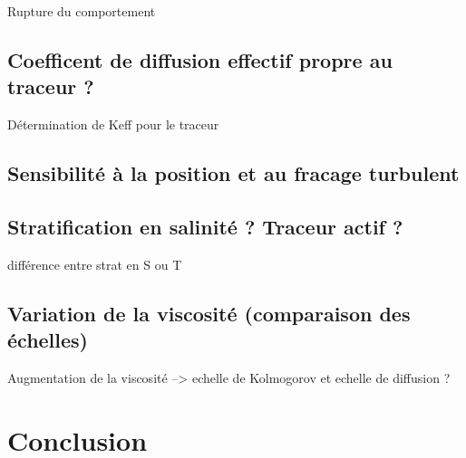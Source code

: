 \documentclass[a4paper,12pt]{article}
\begin{document}
    Rupture du comportement
    
    \subsection{Coefficent de diffusion effectif propre au traceur ?}
    
    Détermination de Keff pour le traceur 
    
    \subsection{Sensibilité à la position et au fracage turbulent}
    
    \subsection{Stratification en salinité ? Traceur actif ?}
    
    différence entre strat en S ou T
    
    \subsection{Variation de la viscosité (comparaison des échelles)}
    
    Augmentation de la viscosité --> echelle de Kolmogorov et echelle de diffusion ?


\section{Conclusion}



%
\end{document}
